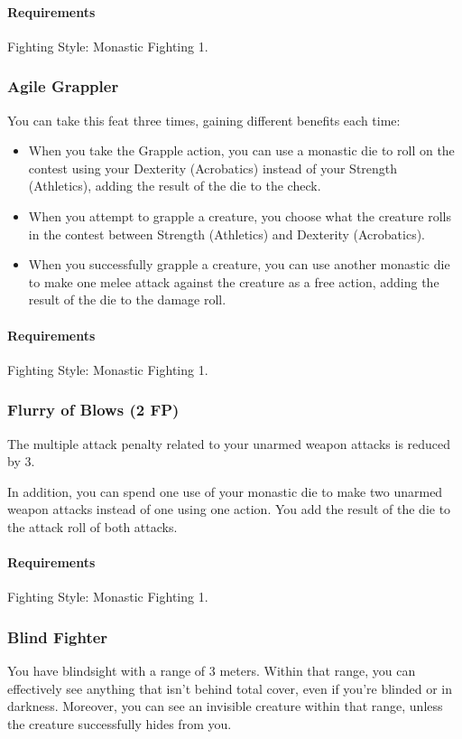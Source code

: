     \paragraph{Requirements} Fighting Style: Monastic Fighting 1.
\subsubsection{Agile Grappler} \label{feat::agilegrappler}
    You can take this feat three times, gaining different benefits each time:
    \begin{itemize}
        \item When you take the Grapple action, you can use a monastic die to roll on the contest using your Dexterity (Acrobatics) instead of your Strength (Athletics), adding the result of the die to the check.
        \item When you attempt to grapple a creature, you choose what the creature rolls in the contest between Strength (Athletics) and Dexterity (Acrobatics).
        \item When you successfully grapple a creature, you can use another monastic die to make one melee attack against the creature as a free action, adding the result of the die to the damage roll.
    \end{itemize}
    \paragraph{Requirements} Fighting Style: Monastic Fighting 1.
\subsubsection{Flurry of Blows (2 FP)} \label{feat::flurryofblows}
    The multiple attack penalty related to your unarmed weapon attacks is reduced by 3.

    In addition, you can spend one use of your monastic die to make two unarmed weapon attacks instead of one using one action.
    You add the result of the die to the attack roll of both attacks.
    \paragraph{Requirements} Fighting Style: Monastic Fighting 1.
\subsubsection{Blind Fighter} \label{feat::blindfighter}
    You have blindsight with a range of 3 meters.
    Within that range, you can effectively see anything that isn't behind total cover, even if you're blinded or in darkness.
    Moreover, you can see an invisible creature within that range, unless the creature successfully hides from you.
